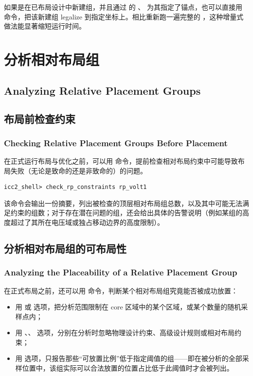 如果是在已布局设计中新建组，并且通过  的 、 为其指定了锚点，也可以直接用  命令，把该新建组 legalize 到指定坐标上。相比重新跑一遍完整的 ，这种增量式做法能显著缩短运行时间。

\section{分析相对布局组}
\subsection*{Analyzing Relative Placement Groups}

\subsection{布局前检查约束}
\subsubsection*{Checking Relative Placement Groups Before Placement}

在正式运行布局与优化之前，可以用  命令，提前检查相对布局约束中可能导致布局失败（无论是致命的还是非致命的）的问题。

\begin{lstlisting}
icc2_shell> check_rp_constraints rp_volt1
\end{lstlisting}

该命令会输出一份摘要，列出被检查的顶层相对布局组总数，以及其中可能无法满足约束的组数；对于存在潜在问题的组，还会给出具体的告警说明（例如某组的高度超过了其所在电压域或独占移动边界的高度限制）。

\subsection{分析相对布局组的可布局性}
\subsubsection*{Analyzing the Placeability of a Relative Placement Group}

在正式布局之前，还可以用  命令，判断某个相对布局组究竟能否被成功放置：
\begin{itemize}
  \item 用  或  选项，把分析范围限制在 core 区域中的某个区域，或某个数量的随机采样点内；
  \item 用 、、 选项，分别在分析时忽略物理设计约束、高级设计规则或相对布局约束；
  \item 用  选项，只报告那些“可放置比例”低于指定阈值的组——即在被分析的全部采样位置中，该组实际可以合法放置的位置占比低于此阈值时才会被列出。
\end{itemize}

